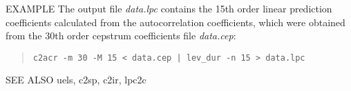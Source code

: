 \begin{options}
\end{options}

\begin{qsection}{EXAMPLE}
The output file {\em data.lpc} contains the 15th order linear prediction
coefficients calculated from the autocorrelation coefficients,
which were obtained from the 30th order cepstrum coefficients
file {\em data.cep}:
\begin{quote}
  \verb!c2acr -m 30 -M 15 < data.cep | lev_dur -n 15 > data.lpc!
\end{quote}
\end{qsection}

\begin{qsection}{SEE ALSO}
  uels, c2sp, c2ir, lpc2c 
\end{qsection}
